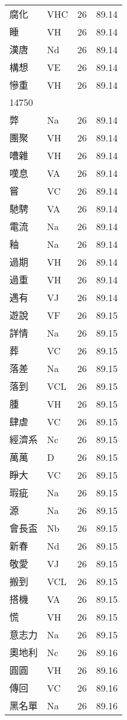 \documentclass[twocolumn]{book}
\begin{document}
\begin{supertabular}{llrr}
腐化 & VHC & 26 &  89.14\\
睡 & VH & 26 &  89.14\\
漢唐 & Nd & 26 &  89.14\\
構想 & VE & 26 &  89.14\\
慘重 & VH & 26 &  89.14\\
14750\\
弊 & Na & 26 &  89.14\\
團聚 & VH & 26 &  89.14\\
嘈雜 & VH & 26 &  89.14\\
嘆息 & VA & 26 &  89.14\\
嘗 & VC & 26 &  89.14\\
馳騁 & VA & 26 &  89.14\\
電流 & Na & 26 &  89.14\\
釉 & Na & 26 &  89.14\\
過期 & VH & 26 &  89.14\\
過重 & VH & 26 &  89.14\\
遇有 & VJ & 26 &  89.14\\
遊說 & VF & 26 &  89.15\\
詳情 & Na & 26 &  89.15\\
葬 & VC & 26 &  89.15\\
落差 & Na & 26 &  89.15\\
落到 & VCL & 26 &  89.15\\
腫 & VH & 26 &  89.15\\
肆虐 & VC & 26 &  89.15\\
經濟系 & Nc & 26 &  89.15\\
萬萬 & D & 26 &  89.15\\
睜大 & VC & 26 &  89.15\\
瑕疵 & Na & 26 &  89.15\\
源 & Na & 26 &  89.15\\
會長盃 & Nb & 26 &  89.15\\
新春 & Nd & 26 &  89.15\\
敬愛 & VJ & 26 &  89.15\\
搬到 & VCL & 26 &  89.15\\
搭機 & VA & 26 &  89.15\\
慌 & VH & 26 &  89.15\\
意志力 & Na & 26 &  89.15\\
奧地利 & Nc & 26 &  89.16\\
圓圓 & VH & 26 &  89.16\\
傳回 & VC & 26 &  89.16\\
黑名單 & Na & 26 &  89.16\\

\end{supertabular}
\end{document}
